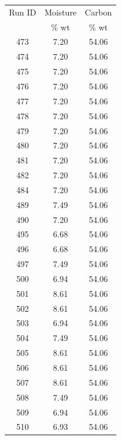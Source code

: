 \documentclass[11pt,twocolumn]{article}
\begin{document}
\begin{center}
\begin{tabular}{ccc}
	Run ID	&	Moisture	&	Carbon	\\
	{}		&	\% wt	&	\% wt	\\
	\hline
	473    &      7.20 &  54.06 \\
	474    &      7.20 &  54.06 \\
	475    &      7.20 &  54.06 \\
	476    &      7.20 &  54.06 \\
	477    &      7.20 &  54.06 \\
	478    &      7.20 &  54.06 \\
	479    &      7.20 &  54.06 \\
	480    &      7.20 &  54.06 \\
	481    &      7.20 &  54.06 \\
	482    &      7.20 &  54.06 \\
	484    &      7.20 &  54.06 \\
	489    &      7.49 &  54.06 \\
	490    &      7.20 &  54.06 \\
	495    &      6.68 &  54.06 \\
	496    &      6.68 &  54.06 \\
	497    &      7.49 &  54.06 \\
	500    &      6.94 &  54.06 \\
	501    &      8.61 &  54.06 \\
	502    &      8.61 &  54.06 \\
	503    &      6.94 &  54.06 \\
	504    &      7.49 &  54.06 \\
	505    &      8.61 &  54.06 \\
	506    &      8.61 &  54.06 \\
	507    &      8.61 &  54.06 \\
	508    &      7.49 &  54.06 \\
	509    &      6.94 &  54.06 \\
	510    &      6.93 &  54.06 \\
\end{tabular}
\end{center}
\end{document}
